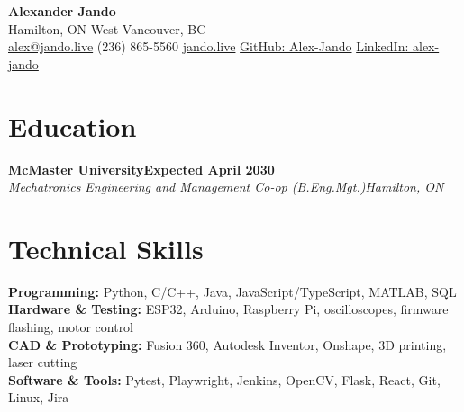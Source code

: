 \documentclass[10pt,letterpaper]{article}
\newcommand{\resumeSubheading}[4]{\textbf{#1}\hfill\textbf{#2}\\\textit{#3}\hfill\textit{#4}\par}
\newcommand{\link}[2]{\href{#1}{#2}}
\begin{document}
{\LARGE\textbf{Alexander Jando}}\\[3pt]
Hamilton, ON \textbar{} West Vancouver, BC\\[2pt]
\href{mailto:alex@jando.live}{alex@jando.live} \textbar{} (236) 865-5560 \textbar{}
\link{https://jando.live}{jando.live} \textbar{}
\link{https://github.com/Alex-Jando}{GitHub: Alex-Jando} \textbar{}
\link{https://www.linkedin.com/in/alex-jando}{LinkedIn: alex-jando}

\section*{Education}
\resumeSubheading{McMaster University}{Expected April 2030}{Mechatronics Engineering and Management Co-op (B.Eng.Mgt.)}{Hamilton, ON}

\section*{Technical Skills}
\textbf{Programming:} Python, C/C++, Java, JavaScript/TypeScript, MATLAB, SQL\\
\textbf{Hardware \& Testing:} ESP32, Arduino, Raspberry Pi, oscilloscopes, firmware flashing, motor control\\
\textbf{CAD \& Prototyping:} Fusion 360, Autodesk Inventor, Onshape, 3D printing, laser cutting\\
\textbf{Software \& Tools:} Pytest, Playwright, Jenkins, OpenCV, Flask, React, Git, Linux, Jira
\end{document}
